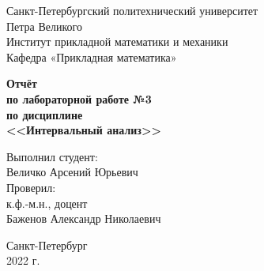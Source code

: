 \thispagestyle{empty}

\begin{center}
\large
Санкт-Петербургский политехнический университет\\
Петра Великого\\
Институт прикладной математики и механики\\
Кафедра «Прикладная математика»\\
\end{center}

\vspace{8em}

\begin{center}
\bfseries
Отчёт\\
по лабораторной работе №3\\
по дисциплине\\
<<Интервальный анализ>>\\
\end{center}

\vspace{8em}

\begin{flushright}
Выполнил студент:\\
Величко Арсений Юрьевич\\
\vspace{2em}
Проверил:\\
к.ф.-м.н., доцент\\
Баженов Александр Николаевич\\
\end{flushright}

\vfill

\begin{center}
Санкт-Петербург\\
2022 г.\\
\end{center}
\newpage